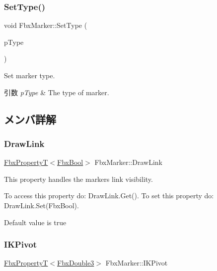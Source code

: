 \subsubsection{\texorpdfstring{Set\+Type()}{SetType()}}
{\footnotesize\ttfamily void Fbx\+Marker\+::\+Set\+Type (\begin{DoxyParamCaption}\item[{\hyperlink{class_fbx_marker_ad1e38753dce9a2212df0364466d9f617}{E\+Type}}]{p\+Type }\end{DoxyParamCaption})}

Set marker type. 
\begin{DoxyParams}{引数}
{\em p\+Type} & The type of marker. \\
\hline
\end{DoxyParams}


\subsection{メンバ詳解}
\mbox{\label{class_fbx_marker_a7ad25f4f97b2e7ac7effeb6e9dc63e4f}} 
\subsubsection{\texorpdfstring{Draw\+Link}{DrawLink}}
{\footnotesize\ttfamily \hyperlink{class_fbx_property_t}{Fbx\+PropertyT}$<$\hyperlink{fbxtypes_8h_a92e0562b2fe33e76a242f498b362262e}{Fbx\+Bool}$>$ Fbx\+Marker\+::\+Draw\+Link}

This property handles the marker\textquotesingle{}s link visibility.

To access this property do\+: Draw\+Link.\+Get(). To set this property do\+: Draw\+Link.\+Set(\+Fbx\+Bool).

Default value is true \mbox{\label{class_fbx_marker_a5bd3a4b16e95b47ea5d391941cb6f00c}} 
\subsubsection{\texorpdfstring{I\+K\+Pivot}{IKPivot}}
{\footnotesize\ttfamily \hyperlink{class_fbx_property_t}{Fbx\+PropertyT}$<$\hyperlink{fbxtypes_8h_ae0a96f14cde566774c7553aa7523b7a7}{Fbx\+Double3}$>$ Fbx\+Marker\+::\+I\+K\+Pivot}

